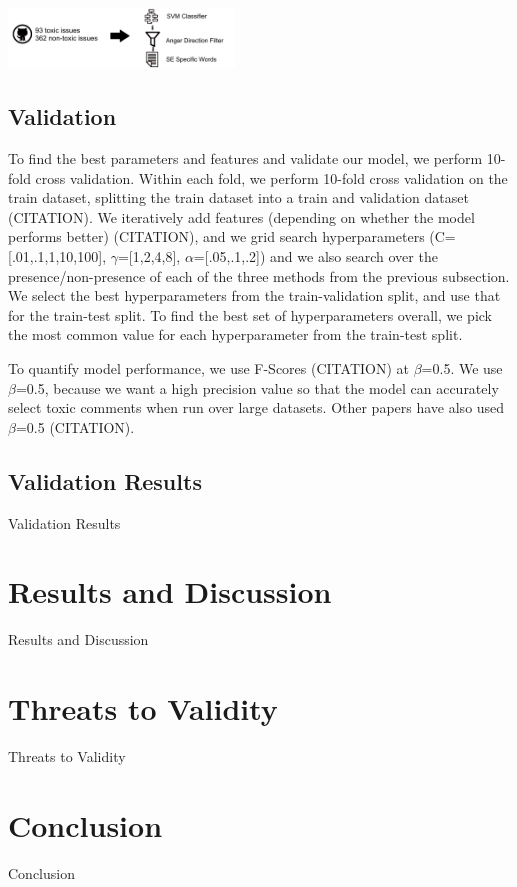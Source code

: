 \documentclass[conference]{IEEEtran}
\begin{document}
\includegraphics[width=6cm]{pipeline.png}


\subsection{Validation} 
To find the best parameters and features and validate our model, we perform 10-fold cross validation. Within each fold, we perform 10-fold cross validation on the train dataset, splitting the train dataset into a train and validation dataset (CITATION). We iteratively add features (depending on whether the model performs better) (CITATION), and we grid search hyperparameters (C=[.01,.1,1,10,100], $\gamma$=[1,2,4,8], $\alpha$=[.05,.1,.2]) and we also search over the presence/non-presence of each of the three methods from the previous subsection. We select the best hyperparameters from the train-validation split, and use that for the train-test split. To find the best set of hyperparameters overall, we pick the most common value for each hyperparameter from the train-test split. 

To quantify model performance, we use F-Scores (CITATION) at $\beta$=0.5. We use $\beta$=0.5, because we want a high precision value so that the model can accurately select toxic comments when run over large datasets. Other papers have also used $\beta$=0.5 (CITATION). 

\subsection{Validation Results} 

Validation Results



\section{Results and Discussion}
Results and Discussion

\section{Threats to Validity}
Threats to Validity

\section{Conclusion}
Conclusion
\end{document}
